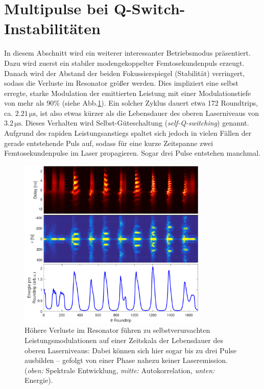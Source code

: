 \documentclass[bachelor,       %
               twoside,        %
               BCOR10mm,       %
               liststotoc,nomtotoc,bibtotoc, %
               english,ngerman, %
               final,          %
               ]{GAUBM}
\begin{document}
\section{Multipulse bei Q-Switch-Instabilitäten}
\label{sec:automod}
In diesem Abschnitt wird ein weiterer interessanter Betriebsmodus präsentiert.
Dazu wird zuerst ein stabiler modengekoppelter Femtosekundenpuls erzeugt.
Danach wird der Abstand der beiden Fokussierspiegel (Stabilität) verringert, sodass die Verluste im Resonator größer werden.
Dies impliziert eine selbst erregte, starke Modulation der emittierten Leistung mit einer Modulationstiefe von mehr als 90\% (siehe Abb.\ref{fig:SelfQSwitch}).
Ein solcher Zyklus dauert etwa 172 Roundtrips, ca. $2.21\,\si{\micro\second}$, ist also etwas kürzer als die Lebensdauer des oberen Laserniveaus von $3.2\,\si{\micro\second}$.
Dieses Verhalten wird Selbst-Güteschaltung (\textit{self-Q-switching}) genannt.
Aufgrund des rapiden Leistungsanstiegs spaltet sich jedoch in vielen Fällen der gerade entstehende Puls auf, sodass für eine kurze Zeitspanne zwei Femtosekundenpulse im Laser propagieren.
Sogar drei Pulse entstehen manchmal.
\begin{figure}[!htb]
   \centering
   \includegraphics[width=0.81\textwidth]{figures/4ms_25GSA_400m_MLrun_ZitternHeftig_239100}
   \caption{Höhere Verluste im Resonator führen zu selbstverursachten Leistungsmodulationen auf einer Zeitskala der Lebensdauer des oberen Laserniveaus:
   Dabei können sich hier sogar bis zu drei Pulse ausbilden -- gefolgt von einer Phase nahezu keiner Laseremission. 
   (\textit{oben:} Spektrale Entwicklung, \textit{mitte:} Autokorrelation, \textit{unten:} Energie).}
   \label{fig:SelfQSwitch}
\end{figure}
\end{document}
